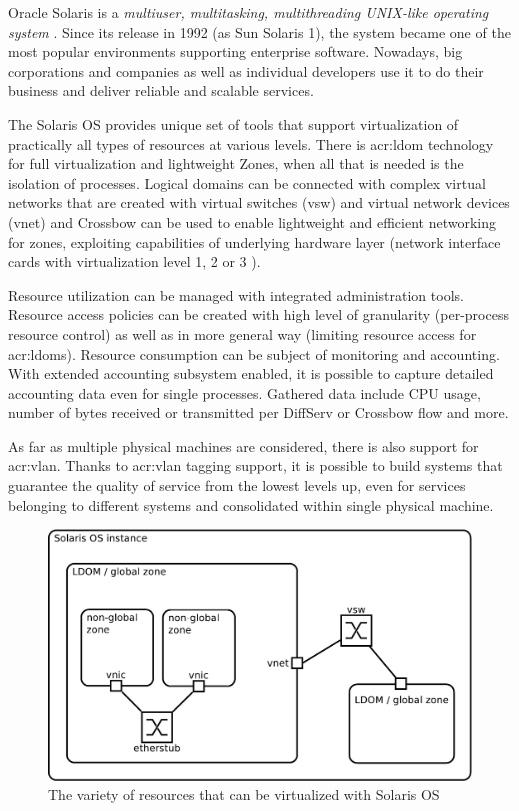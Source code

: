\documentclass[11pt]{book}
\begin{document}
      Oracle Solaris is a \textit{multiuser, multitasking, multithreading UNIX-like operating system} \cite{reference}.
      Since its release in 1992 (as Sun Solaris 1), the system became one of the most popular environments supporting
      enterprise software. Nowadays, big corporations and companies as well as individual developers use it to do their
      business and deliver reliable and scalable services.

      The Solaris OS provides unique set of tools that support virtualization of practically all types of resources at
      various levels. There is \gls{acr:ldom} technology for full virtualization and lightweight Zones, when all that is
      needed is the isolation of processes. Logical domains can be connected with complex virtual networks that are
      created with virtual switches (vsw) and virtual network devices (vnet) \cite{ldomag} and Crossbow can be used to
      enable lightweight and efficient networking for zones, exploiting capabilities of underlying hardware layer
      (network interface cards with virtualization level 1, 2 or 3 \cite{santos}).

      Resource utilization can be managed with integrated administration tools. Resource access policies can be created
      with high level of granularity (per-process resource control) as well as in more general way (limiting resource
      access for \gls{acr:ldom}s). Resource consumption can be subject of monitoring and accounting. With extended
      accounting subsystem enabled, it is possible to capture detailed accounting data even for single processes.
      Gathered data include CPU usage, number of bytes received or transmitted per DiffServ or Crossbow flow and more.

      As far as multiple physical machines are considered, there is also support for \gls{acr:vlan}.  Thanks to
      \gls{acr:vlan} tagging support, it is possible to build systems that guarantee the quality of service from the
      lowest levels up, even for services belonging to different systems and consolidated within single physical
      machine.

      \begin{figure}[H]
        \begin{center}
          \includegraphics[width=.7\textwidth]{img/solaris/full-featured.pdf}
        \end{center}

        \caption{The variety of resources that can be virtualized with Solaris OS}
      \end{figure}
\end{document}

